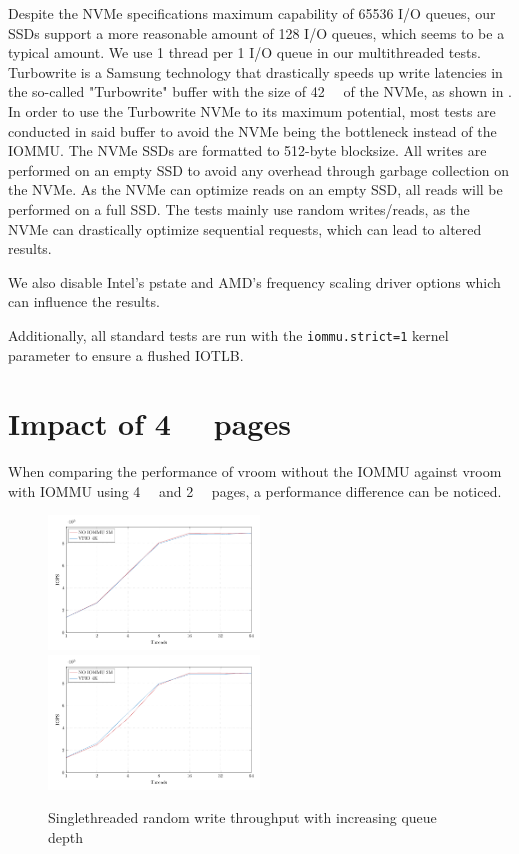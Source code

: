 Despite the NVMe specifications maximum capability of 65536 I/O queues, our SSDs support a more reasonable amount of 128 I/O queues, which seems to be a typical amount.
We use 1 thread per 1 I/O queue in our multithreaded tests. Turbowrite is a Samsung technology that drastically speeds up write latencies in the so-called "Turbowrite" buffer with the size of \qty{42}{\giga\byte} of the NVMe, as shown in \cite{vroom}. In order to use the Turbowrite NVMe to its maximum potential, most tests are conducted in said buffer to avoid the NVMe being the bottleneck instead of the IOMMU.
The NVMe SSDs are formatted to 512-byte blocksize. All writes are performed on an empty SSD to avoid any overhead through garbage collection on the NVMe. As the NVMe can optimize reads on an empty SSD, all reads will be performed on a full SSD. The tests mainly use random writes/reads, as the NVMe can drastically optimize sequential requests, which can lead to altered results.

We also disable Intel's pstate and AMD's frequency scaling driver options which can influence the results.

Additionally, all standard tests are run with the \texttt{iommu.strict=1} kernel parameter to ensure a flushed IOTLB.

\section{Impact of \qty{4}{\kibi\byte} pages}
When comparing the performance of vroom without the IOMMU against vroom with IOMMU using \qty{4}{\kibi\byte} and \qty{2}{\mebi\byte} pages, a performance difference can be noticed.

\begin{figure}[H]
  \centering
   {\includegraphics[width=0.5\textwidth]{figures/qdnt1_1page}}
   {\includegraphics[width=0.5\textwidth]{figures/qdnt1_512page}}
  \caption{Singlethreaded random write throughput with increasing queue depth}
  \label{fig:qdnt1_4kib}
\end{figure}

